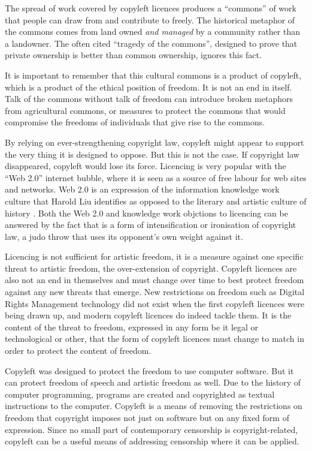 \documentclass[11pt, a4]{article}
\begin{document}
The spread of work covered by copyleft licences produces a ``commons'' of work that people can draw from and contribute to freely. The historical metaphor of the commons comes from land owned \emph{and managed} by a community rather than a landowner. The often cited ``tragedy of the commons'', designed to prove that private ownership is better than common ownership, ignores this fact. 

It is important to remember that this cultural commons is a product of copyleft, which is a product of the ethical position of freedom. It is not an end in itself. Talk of the commons without talk of freedom can introduce broken metaphors from agricultural commons, or measures to protect the commons that would compromise the freedoms of individuals that give rise to the commons.

By relying on ever-strengthening copyright law, copyleft might appear to support the very thing it is designed to oppose. But this is not the case. If copyright law disappeared, copyleft would lose its force. Licencing is very popular with the ``Web 2.0'' internet bubble, where it is seen as a source of free labour for web sites and networks. Web 2.0 is an expression of the information knowledge work culture that Harold Liu identifies as opposed to the literary and artistic culture of history \cite{Liu2004}. Both the Web 2.0 and knowledge work objctions to licencing can be answered by the fact that is a form of intensification\cite{Harold2007} or ironisation of copyright law, a judo throw that uses its opponent's own weight against it. 

Licencing is not sufficient for artistic freedom, it is a measure against one specific threat to artistic freedom, the over-extension of copyright. Copyleft licences are also not an end in themselves and must change over time to best protect freedom against any new threats that emerge. New restrictions on freedom such as Digital Rights Management technology did not exist when the first copyleft licences were being drawn up, and modern copyleft licences do indeed tackle them. It is the content of the threat to freedom, expressed in any form be it legal or technological or other, that the form of copyleft licences must change to match in order to protect the content of freedom.

Copyleft was designed to protect the freedom to use computer software. But it can protect freedom of speech and artistic freedom as well. Due to the history of computer programming, programs are created and copyrighted as textual instructions to the computer. Copyleft is a means of removing the restrictions on freedom that copyright imposes not just on software but on any fixed form of expression. Since no small part of contemporary censorship is copyright-related, copyleft can be a useful means of addressing censorship where it can be applied.
\end{document}
